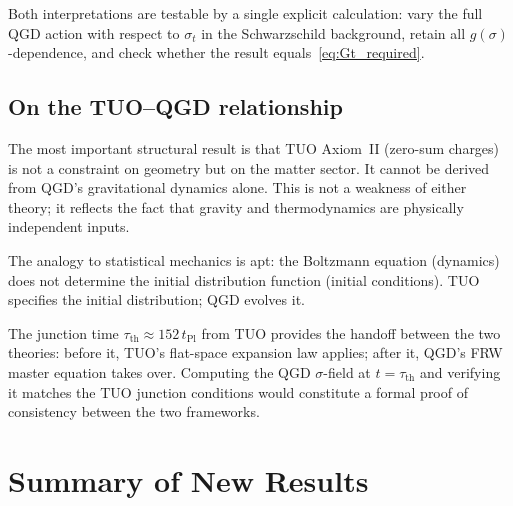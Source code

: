 \documentclass[11pt,a4paper]{article}
\theoremstyle{plain}
\theoremstyle{definition}
\theoremstyle{remark}
\begin{document}
Both interpretations are testable by a single explicit calculation: vary the
full QGD action with respect to $\sigma_t$ in the Schwarzschild background,
retain all $g(\sigma)$-dependence, and check whether the result
equals~\eqref{eq:Gt_required}.

\subsection{On the TUO--QGD relationship}

The most important structural result is that TUO Axiom~II (zero-sum charges)
is not a constraint on geometry but on the matter sector.  It cannot be
derived from QGD's gravitational dynamics alone.  This is not a weakness of
either theory; it reflects the fact that gravity and thermodynamics are
physically independent inputs.

The analogy to statistical mechanics is apt: the Boltzmann equation
(dynamics) does not determine the initial distribution function (initial
conditions).  TUO specifies the initial distribution; QGD evolves it.

The junction time $\tau_\mathrm{th} \approx 152\,t_\mathrm{Pl}$ from TUO
provides the handoff between the two theories: before it, TUO's flat-space
expansion law applies; after it, QGD's FRW master equation takes over.
Computing the QGD $\sigma$-field at $t = \tau_\mathrm{th}$ and verifying
it matches the TUO junction conditions would constitute a formal proof of
consistency between the two frameworks.

\section{Summary of New Results}
\end{document}

